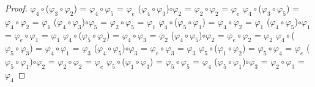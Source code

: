 \documentclass[10pt,a4paper,oneside]{article}
\begin{document}
\begin{proof}
				\newline
				\newline
				$\varphi_{4}\circ$($\varphi_{3}\circ\varphi_{2}$) = $\varphi_{4}\circ\varphi_{5}$ = $\varphi_{e}$
				\newline
				($\varphi_{4}\circ\varphi_{3}$)$\circ\varphi_{2}$ = $\varphi_{2}\circ\varphi_{2}$ = $\varphi_{e}$
				\newline
				\newline
				$\varphi_{4}\circ$($\varphi_{3}\circ\varphi_{5}$) = $\varphi_{4}\circ\varphi_{2}$ = $\varphi_{1}$
				\newline
				($\varphi_{4}\circ\varphi_{3}$)$\circ\varphi_{5}$ = $\varphi_{2}\circ\varphi_{5}$ = $\varphi_{1}$
				\newline
				\newline
				$\varphi_{4}\circ$($\varphi_{5}\circ\varphi_{1}$) = $\varphi_{4}\circ\varphi_{2}$ = $\varphi_{1}$
				\newline
				($\varphi_{4}\circ\varphi_{5}$)$\circ\varphi_{1}$ = $\varphi_{e}\circ\varphi_{1}$ = $\varphi_{1}$
				\newline
				\newline
				$\varphi_{4}\circ$($\varphi_{5}\circ\varphi_{2}$) = $\varphi_{4}\circ\varphi_{3}$ = $\varphi_{2}$
				\newline
				($\varphi_{4}\circ\varphi_{5}$)$\circ\varphi_{2}$ = $\varphi_{e}\circ\varphi_{2}$ = $\varphi_{2}$
				\newline
				\newline
				$\varphi_{4}\circ$($\varphi_{5}\circ\varphi_{3}$) = $\varphi_{4}\circ\varphi_{1}$ = $\varphi_{3}$
				\newline
				($\varphi_{4}\circ\varphi_{5}$)$\circ\varphi_{3}$ = $\varphi_{e}\circ\varphi_{3}$ = $\varphi_{3}$
				\newline
				\newline
				$\varphi_{5}\circ$($\varphi_{1}\circ\varphi_{2}$) = $\varphi_{5}\circ\varphi_{4}$ = $\varphi_{e}$
				\newline
				($\varphi_{5}\circ\varphi_{1}$)$\circ\varphi_{2}$ = $\varphi_{2}\circ\varphi_{2}$ = $\varphi_{e}$
				\newline
				\newline
				$\varphi_{5}\circ$($\varphi_{1}\circ\varphi_{3}$) = $\varphi_{5}\circ\varphi_{5}$ = $\varphi_{4}$
				\newline
				($\varphi_{5}\circ\varphi_{1}$)$\circ\varphi_{3}$ = $\varphi_{2}\circ\varphi_{3}$ = $\varphi_{4}$
				\newline

\end{proof}
\end{document}
